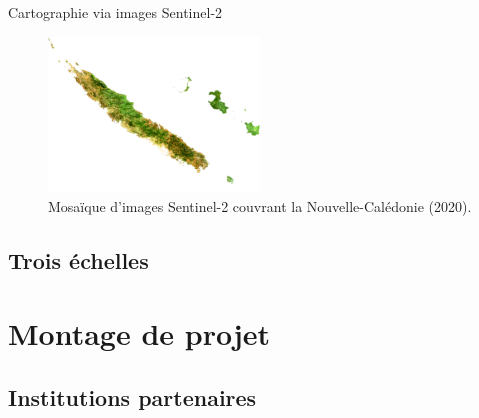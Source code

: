 \documentclass[10pt,table,dvipsnames,compress]{beamer}
\begin{document}
\begin{frame}[label={sec:org11a03be}]{Cartographie via images Sentinel-2}
\begin{figure}[htbp]
\centering
\includegraphics[width=0.5\textwidth]{figs/newcal-S2.png}
\caption{Mosaïque d'images Sentinel-2 couvrant la Nouvelle-Calédonie (2020).}
\end{figure}
\end{frame}

\subsection{Trois échelles}
\label{sec:org1d7cba3}

\section{Montage de projet}
\label{sec:orga7e03ee}

\subsection{Institutions partenaires}
\label{sec:orge9436d5}
\end{document}
